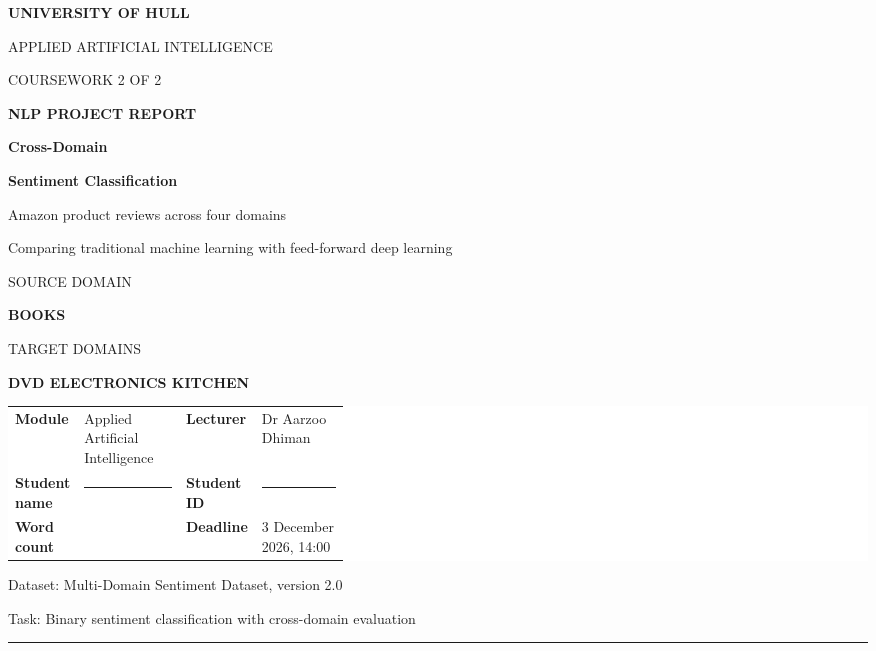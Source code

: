 \documentclass[11pt,a4paper]{article}
\begin{document}
\hypersetup{pageanchor=false}
\begin{titlepage}
\pagecolor{Navy}
\color{white}
\noindent{\color{Teal}\rule{\textwidth}{2pt}\par}
\vspace*{0.65cm}
{\Large\sffamily\bfseries UNIVERSITY OF HULL\par}
\vspace{0.15cm}
{\small\sffamily APPLIED ARTIFICIAL INTELLIGENCE\par}
{\small\sffamily COURSEWORK 2 OF 2\par}
\vspace{1.45cm}
{\color{Teal}\large\sffamily\bfseries NLP PROJECT REPORT\par}
\vspace{0.45cm}
{\fontsize{30}{35}\selectfont\sffamily\bfseries Cross-Domain\par}
{\fontsize{30}{35}\selectfont\sffamily\bfseries Sentiment Classification\par}
\vspace{0.35cm}
{\large\sffamily Amazon product reviews across four domains\par}
\vspace{0.25cm}
{\small\color{white!75}Comparing traditional machine learning with feed-forward deep learning\par}
\vspace{0.75cm}
\vspace{0.55cm}
{\small\sffamily\color{white!75}SOURCE DOMAIN\par}
{\large\sffamily\bfseries BOOKS\par}
\vspace{0.20cm}
{\small\sffamily\color{white!75}TARGET DOMAINS\par}
{\large\sffamily\bfseries DVD \textbullet{} ELECTRONICS \textbullet{} KITCHEN\par}
\vfill
\colorbox{white}{%
  \parbox{\dimexpr\textwidth-2\fboxsep}{%
    \color{Navy}\sffamily
    \begin{tabularx}{\linewidth}{@{}>{\bfseries}p{0.20\linewidth}X>{\bfseries}p{0.19\linewidth}X@{}}
      Module & Applied Artificial Intelligence & Lecturer & Dr Aarzoo Dhiman\\[0.20cm]
      Student name & \rule{\linewidth}{0.4pt} & Student ID & \rule{\linewidth}{0.4pt}\\[0.20cm]
      Word count &  & Deadline & 3 December 2026, 14:00\\
    \end{tabularx}
  }}
\par
\vspace{0.45cm}
{\small\sffamily Dataset: Multi-Domain Sentiment Dataset, version 2.0\par}
{\small\sffamily Task: Binary sentiment classification with cross-domain evaluation\par}
\vspace{0.3cm}
{\color{Teal}\rule{\textwidth}{2pt}\par}
\end{titlepage}
\hypersetup{pageanchor=true}
\nopagecolor
\color{black}
\setcounter{page}{1}
\end{document}
